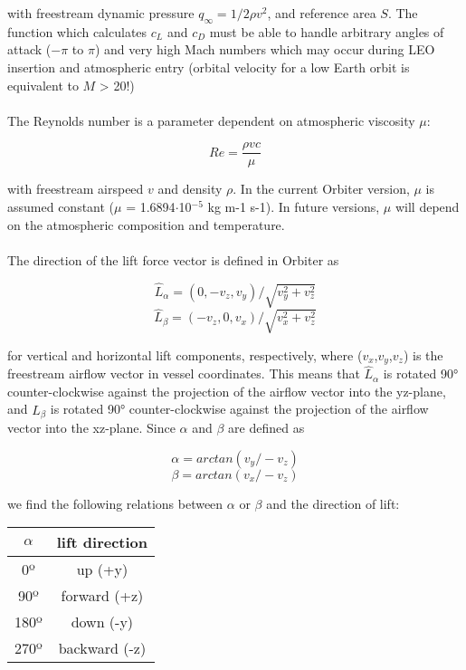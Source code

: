 \documentclass[Orbiter Developer Manual.tex]{subfiles}
\begin{document}
\noindent
with freestream dynamic pressure $q_{\infty} = 1/2\rho v^{2}$, and reference area $S$. The function which calculates $c_{L}$ and $c_{D}$ must be able to handle arbitrary angles of attack ($-\pi$ to $\pi$) and very high Mach numbers which may occur during LEO insertion and atmospheric entry (orbital velocity for a low Earth orbit is equivalent to $M$ > 20!)\\
\\
The Reynolds number is a parameter dependent on atmospheric viscosity $\mu$:

\[ Re = \frac{\rho vc}{\mu} \]

\noindent
with freestream airspeed $v$ and density $\rho$. In the current Orbiter version, $\mu$ is assumed constant ($\mu$ = 1.6894$\cdot$10$^{-5}$ kg m-1 s-1). In future versions, $\mu$ will depend on the atmospheric composition and temperature.\\
\\
The direction of the lift force vector is defined in Orbiter as

\[ \hat{L}_{\alpha} = (0,-v_{z},v_{y}) / \sqrt{v_{y}^{2} + v_{z}^{2}} \]
\[ \hat{L}_{\beta} = (-v_{z},0,v_{x}) / \sqrt{v_{x}^{2} + v_{z}^{2}} \]

\noindent
for vertical and horizontal lift components, respectively, where ($v_{x}$,$v_{y}$,$v_{z}$) is the freestream airflow vector in vessel coordinates. This means that $\hat{L}_{\alpha}$ is rotated 90° counter-clockwise against the projection of the airflow vector into the yz-plane, and $\hat{L}_{\beta}$ is rotated 90° counter-clockwise against the projection of the airflow vector into the xz-plane. Since $\alpha$ and $\beta$ are defined as

\[ \alpha = arctan(v_{y} / -v_{z}) \]
\[ \beta = arctan(v_{x} / -v_{z}) \]

\noindent
we find the following relations between $\alpha$ or $\beta$ and the direction of lift:

\begin{table}[H]
	\centering
	\begin{tabular}{ |c|c| }
	\hline\rule{0pt}{2ex}
	\textbf{$\alpha$} & \textbf{lift direction} \\
	\hline\rule{0pt}{2ex}
	0º & up (+y)\\
	\hline\rule{0pt}{2ex}
	90º & forward (+z)\\
	\hline\rule{0pt}{2ex}
	180º & down (-y)\\
	\hline\rule{0pt}{2ex}
	270º & backward (-z)\\
	\hline
	\end{tabular}
\end{table}
\end{document}
